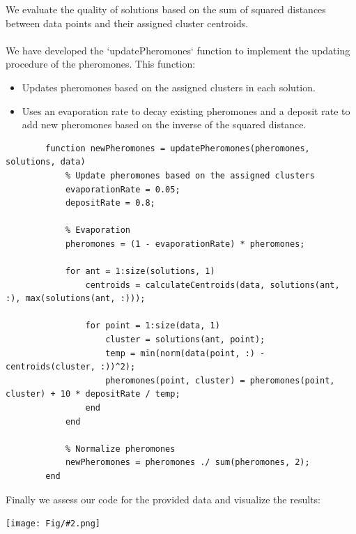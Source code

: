 \documentclass[]{article}
\newcommand{\pict}[2]{\begin{center}
		\texttt{[image: Fig/\#2.png]}
\end{center}}
\begin{document}
	We evaluate the quality of solutions based on the sum of squared distances between data points and their assigned cluster centroids.\\\\
	We have developed the `updatePheromones` function to implement the updating procedure of the pheromones. This function:
	\begin{itemize}
		\item Updates pheromones based on the assigned clusters in each solution.
		\item Uses an evaporation rate to decay existing pheromones and a deposit rate to add new pheromones based on the inverse of the squared distance.
	\end{itemize}
	\begin{lstlisting}
		function newPheromones = updatePheromones(pheromones, solutions, data)
			% Update pheromones based on the assigned clusters
			evaporationRate = 0.05;
			depositRate = 0.8;
			
			% Evaporation
			pheromones = (1 - evaporationRate) * pheromones;
			
			for ant = 1:size(solutions, 1)
				centroids = calculateCentroids(data, solutions(ant, :), max(solutions(ant, :)));
				
				for point = 1:size(data, 1)
					cluster = solutions(ant, point);
					temp = min(norm(data(point, :) - centroids(cluster, :))^2);
					pheromones(point, cluster) = pheromones(point, cluster) + 10 * depositRate / temp;
				end
			end
			
			% Normalize pheromones
			newPheromones = pheromones ./ sum(pheromones, 2);
		end
	\end{lstlisting}
	
	Finally we assess our code for the provided data and visualize the results:
	\pict{0.5}{F22}
\end{document}
